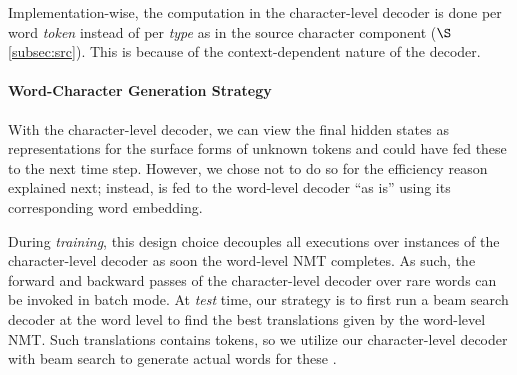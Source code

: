 Implementation-wise, the computation in the
character-level decoder is done per word {\it token} instead of per {\it type} as in the source
character component ($\S$\ref{subsec:src}). 
This is because of the context-dependent nature of the decoder.



\paragraph{Word-Character Generation Strategy}
\label{subsubsec:strategy}
With the character-level decoder, we can view the final hidden states as representations for
the surface forms of unknown tokens and could have fed these to the next
time step. However, we chose not to do so for the efficiency reason explained
next; instead, \unk{} is fed to the word-level decoder
``as is'' using its corresponding word embedding.

During {\it training}, this design choice decouples all executions over \unk{} instances of the
character-level decoder as soon the word-level NMT
completes. As such, the forward and backward passes of the character-level
decoder over rare words can be invoked in batch mode. At {\it test} time,
our strategy is to first run a beam search decoder at the word level to
find the best translations given by the
word-level NMT. Such translations contains \unk{} tokens, so we utilize our
character-level decoder with beam search to generate actual words for these \unk{}.

